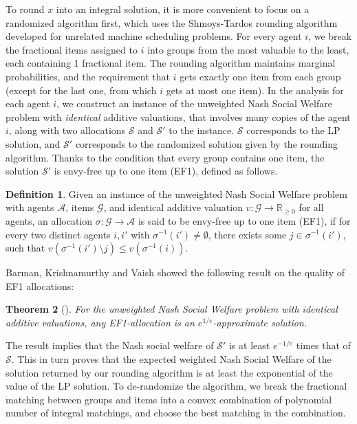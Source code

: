 \documentclass[10pt,a4paper]{article}
\newtheorem{theorem}{Theorem}[section]
\theoremstyle{definition}
\newtheorem{definition}[theorem]{Definition}
\theoremstyle{plain}
\newcommand\calS{{\mathcal{S}}}
\newcommand\calA{{\mathcal{A}}}
\newcommand\calG{{\mathcal{G}}}
\newcommand{\R}{{\mathbb{R}}}
\begin{document}
To round $x$ into an integral solution, it is more convenient to focus on a randomized algorithm first, which uses the Shmoys-Tardos rounding algorithm \cite{ST93} developed for unrelated machine scheduling problems. 
For every agent $i$, we break the fractional items assigned to $i$ into groups from the most valuable to the least, each containing 1 fractional item. The rounding algorithm maintains marginal probabilities, and the requirement that $i$ gets exactly one item from each group (except for the last one, from which $i$ gets at most one item).  In the analysis for each agent $i$, we construct an instance of the unweighted Nash Social Welfare problem with \emph{identical} additive valuations, that involves many copies of the agent $i$, along with two allocations $\calS$ and $\calS'$ to the instance. $\calS$ corresponds to the LP solution, and $\calS'$ corresponds to the randomized solution given by the rounding algorithm. Thanks to the condition that every group contains one item, the solution $\calS'$ is envy-free up to one item (EF1), defined as follows.
    \begin{definition}
        Given an instance of the unweighted Nash Social Welfare problem with agents $\calA$, items $\calG$, and identical additive valuation $v: \calG \to \R_{\geq 0}$ for all agents, an allocation $\sigma: \calG \to \calA$ is said to be envy-free up to one item (EF1),  if for every two distinct agents $i, i'$ with $\sigma^{-1}(i') \neq \emptyset$, there exists some $j \in \sigma^{-1}(i')$, such that $v(\sigma^{-1}(i') \setminus j) \leq v(\sigma^{-1}(i))$.
    \end{definition}

Barman, Krishnamurthy and Vaish \cite{BKV18} showed the following result on the quality of EF1 allocations:
    \begin{theorem}[\cite{BKV18}]
        \label{thm:EF1}
        For the unweighted Nash Social Welfare problem with identical additive valuations, any EF1-allocation is an $e^{1/e}$-approximate solution. 
    \end{theorem} %

The result implies that the Nash social welfare of $\calS'$ is at least $e^{-1/e}$ times that of $\calS$. This in turn proves that the expected weighted Nash Social Welfare of the solution returned by our rounding algorithm is at least the exponential of the value of the LP solution.  To de-randomize the algorithm, we break the fractional matching between groups and items into a convex combination of polynomial number of integral matchings, and choose the best matching in the combination. 
\end{document}
